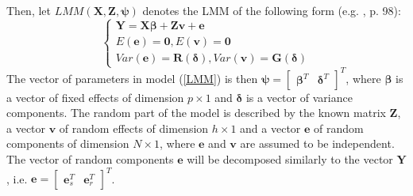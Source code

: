 Then, let $LMM(\mathbf{X}, \mathbf{Z}, \boldsymbol{\psi})$ denotes the LMM of the following form (e.g. \cite{rao2015small}, p. 98):
\begin{equation}
	\label{LMM}
	\left\{ \begin{array}{c}
		\mathbf{Y}=\mathbf{X}\boldsymbol{\beta} + \mathbf{Z}\mathbf{v}+\mathbf{e} \\
		E(\mathbf{e})=\mathbf{0}, E(\mathbf{v})=\mathbf{0} \\
		Var(\mathbf{e})=\mathbf{R}(\pmb{\delta}), Var(\mathbf{v})=\mathbf{G}(\pmb{\delta})
	\end{array} \right.
\end{equation}
The vector of parameters in model (\ref{LMM}) is then $\boldsymbol{\psi}=\begin{bmatrix}
	\boldsymbol{\beta}^T &  \pmb{\delta}^T
\end{bmatrix}^T$,
where $\boldsymbol{\beta}$ is a vector of fixed effects of dimension $p \times 1$ and $\pmb{\delta}$ is a vector of variance components. The random part of the model is described by the known matrix $\mathbf{Z}$, a vector $\mathbf{v}$ of random effects of dimension $h \times 1$ and a vector $\mathbf{e}$ of random components of dimension {$N\times 1$}, where $\mathbf{e}$ and $\mathbf{v}$ are assumed to be independent. The vector of random components $\mathbf{e}$ will be decomposed similarly to the vector $\mathbf{Y}$, i.e. $\mathbf{e}=\begin{bmatrix}
	\mathbf{e}_s^T & \mathbf{e}_r^T
\end{bmatrix}^T$.

